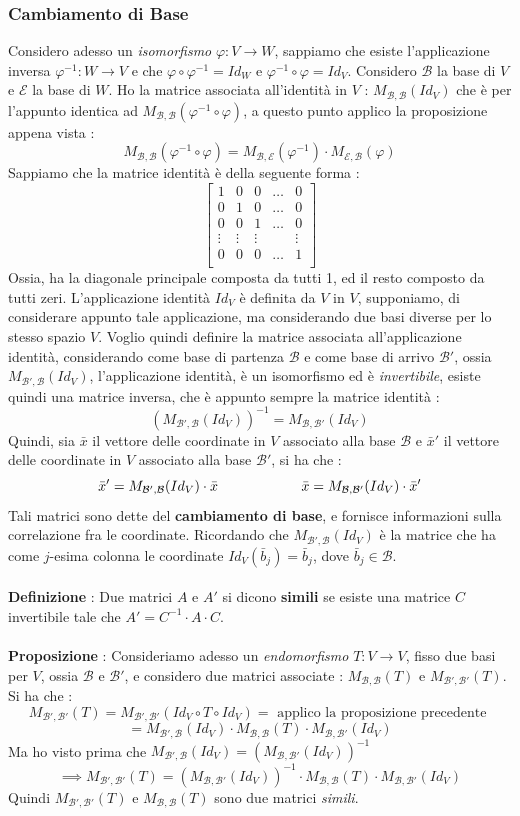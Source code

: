 \documentclass[12pt, letterpaper]{article}
\newcommand{\E}{{\mathcal E}}
\newcommand{\B}{{\mathcal B}}
\newcommand{\spaz}{{\text{\hphantom{aa}}}}
\newcommand{\acc}{\\\hphantom{}\\}
\begin{document}
\subsubsection{Cambiamento di Base}
Considero adesso un \textit{isomorfismo} \(\varphi:V\rightarrow W\), sappiamo che esiste l'applicazione inversa \(\varphi^{-1}
:W\rightarrow V\) e che \(\varphi\circ \varphi^{-1}=Id_W\) e \(\varphi^{-1}\circ \varphi=Id_V\). Considero 
\(\B\) la base di \(V\) e \(\E\) la base di \(W\). Ho la matrice associata all'identità in \(V\) : \(M_{\B,\B}(Id_V)\) che è 
per l'appunto identica ad \(M_{\B,\B}(\varphi^{-1}\circ \varphi)\), a questo punto applico la proposizione appena vista : 
$$M_{\B,\B}(\varphi^{-1}\circ \varphi)=M_{\B,\E}(\varphi^{-1})\cdot M_{\E,\B}(\varphi)$$
Sappiamo che la matrice identità è della seguente forma : $$\begin{bmatrix}
    1&0&0&\dots&0\\
    0&1&0&\dots&0\\
    0&0&1&\dots&0\\
    \vdots&\vdots&\vdots&&\vdots\\
    0&0&0&\dots&1\\
\end{bmatrix}$$
Ossia, ha la diagonale principale composta da tutti 1, ed il resto composto da tutti zeri. L'applicazione identità \(Id_V\) 
è definita da \(V\) in \(V\), supponiamo, di considerare appunto tale applicazione, ma considerando due basi diverse per lo stesso 
spazio \(V\). Voglio quindi definire la matrice associata all'applicazione identità, considerando come base di partenza 
\(\B\) e come base di arrivo \(\B'\), ossia \(M_{\B',\B}(Id_V)\), l'applicazione identità, è un isomorfismo ed è \textit{invertibile}, 
esiste quindi una matrice inversa, che è appunto sempre la matrice identità :
$$(M_{\B',\B}(Id_V))^{-1}=M_{\B,\B'}(Id_V)$$
Quindi, sia \(\bar x\) il vettore delle coordinate in \(V\) associato alla base \(\B\) e 
\(\bar x'\) il vettore delle coordinate in \(V\) associato alla base \(\B'\), si ha che :$$
\bar x' = M_{\B',\B}(Id_V)\cdot \bar x\spaz\spaz\spaz\spaz\spaz\spaz\bar x = M_{\B,\B'}(Id_V)\cdot \bar x'
$$
Tali matrici sono dette del \textbf{cambiamento di base}, e fornisce informazioni sulla correlazione 
fra le coordinate. Ricordando che \(M_{\B',\B}(Id_V)\) è la matrice che ha come \(j\)-esima colonna le coordinate 
\(Id_V(\bar b_j)=\bar b_j\), dove \(\bar b_j \in \B\).\acc 
\textbf{Definizione} : Due matrici \(A\) e \(A'\) si dicono \textbf{simili} se esiste una matrice \(C\) invertibile tale
che \(A'=C^{-1}\cdot A\cdot C\).\acc 
\textbf{Proposizione} : Consideriamo adesso un \textit{endomorfismo} \(T:V\rightarrow V\), fisso due basi per \(V\), ossia \(\B\) e \(\B'\), 
e considero due matrici associate : \(M_{\B,\B}(T)\) e \(M_{\B',\B'}(T)\). Si ha che :
$$M_{\B',\B'}(T)=M_{\B',\B'}(Id_V\circ T\circ Id_V)=\text{ applico la proposizione precedente }$$$$=
M_{\B',\B}(Id_V)\cdot M_{\B,\B}(T)\cdot M_{\B,\B'}(Id_V)$$
Ma ho visto prima che \(M_{\B',\B}(Id_V)=(M_{\B,\B'}(Id_V))^{-1}\)$$
\implies M_{\B',\B'}(T)= (M_{\B,\B'}(Id_V))^{-1}\cdot M_{\B,\B}(T)\cdot M_{\B,\B'}(Id_V)$$
Quindi \( M_{\B',\B'}(T)\) e \( M_{\B,\B}(T)\) sono due matrici \textit{simili}.
\end{document}
